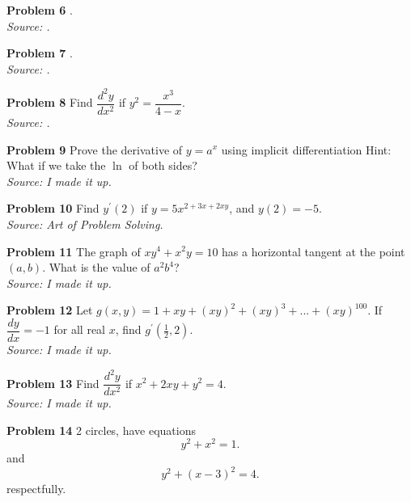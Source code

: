 \documentclass{article}
\begin{document}
\vspace{1cm}

\textbf{Problem 6} .\\
\textit{Source: .}

\vspace{1cm}

\textbf{Problem 7} .\\
\textit{Source: .}

\vspace{1cm}

\textbf{Problem 8} Find $\dfrac {d^2y} {dx^2}$ if $y^2 = \dfrac {x^3} {4 - x}$.\\
\textit{Source: .}

\vspace{1cm}

\textbf{Problem 9} Prove the derivative of $y = a^x$ using implicit differentiation Hint: What if we take the $\ln$ of both sides?\\
\textit{Source: I made it up.}

\vspace{1cm}

\textbf{Problem 10} Find $y^{\prime} (2)$ if $y = 5x^{2 + 3x + 2xy}$, and $y(2) = -5$.\\
\textit{Source: Art of Problem Solving.}

\vspace{1cm}

\textbf{Problem 11} The graph of $xy^4 + x^2y = 10$ has a horizontal tangent at the point $(a , b)$. What is the value of $a^2b^4$?\\
\textit{Source: I made it up.}

\vspace{1cm}

\textbf{Problem 12} Let $g\left( x, y \right) = 1 + xy + \left( xy \right)^2 + \left( xy \right)^3 + ... + \left( xy \right)^{100}$. If $\dfrac {dy} {dx} = -1$ for all real $x$, find $g^{\prime}\left( \frac {1} {2}, 2 \right)$.\\
\textit{Source: I made it up.}

\vspace{1cm}

\textbf{Problem 13} Find $\dfrac {d^2y} {dx^2}$ if $x^2 + 2xy + y^2 = 4$.\\
\textit{Source: I made it up.}

\vspace{1cm}

\textbf{Problem 14} 2 circles, have equations
    \[y^2 + x^2 = 1.\]
    and
    \[y^2 + (x - 3)^2 = 4.\]
    respectfully.
\end{document}

